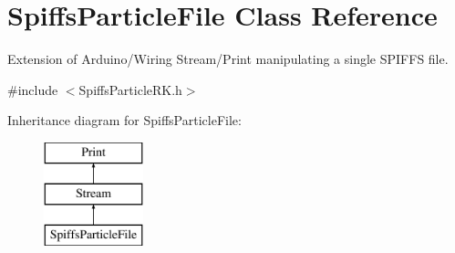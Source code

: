 \hypertarget{class_spiffs_particle_file}{}\section{Spiffs\+Particle\+File Class Reference}
\label{class_spiffs_particle_file}


Extension of Arduino/\+Wiring Stream/\+Print manipulating a single S\+P\+I\+F\+FS file.  




{\ttfamily \#include $<$Spiffs\+Particle\+R\+K.\+h$>$}

Inheritance diagram for Spiffs\+Particle\+File\+:\begin{figure}[H]
\begin{center}
\leavevmode
\includegraphics[height=3.000000cm]{class_spiffs_particle_file}
\end{center}
\end{figure}
